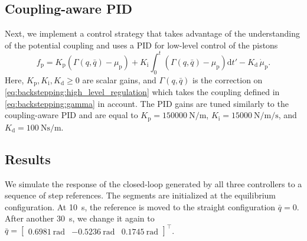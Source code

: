 %
\subsection{Coupling-aware PID}
%
Next, we implement a control strategy that takes advantage of the understanding of the potential coupling and uses a PID for low-level control of the pistons
%
\begin{equation}
    f_{\mathrm{p}} = K_\mathrm{p} \left (\Gamma(q, \bar{q})-\mu_\mathrm{p} \right ) +  K_\mathrm{i} \int_{0}^t \left ( \Gamma(q, \bar{q})-\mu_\mathrm{p} \right ) \mathrm{d}t' - K_\mathrm{d} \, \dot{\mu}_\mathrm{p}.
\end{equation}
%
Here, $K_\mathrm{p},K_\mathrm{i},K_\mathrm{d} \geq 0$ are scalar gains, and $\Gamma(q, \bar{q})$ is the correction on \eqref{eq:backstepping:high_level_regulation} which takes the coupling defined in \eqref{eq:backstepping:gamma} in account. 
%
The PID gains are tuned similarly to the coupling-aware PID
and are equal to $K_\mathrm{p} = \SI{150 000}{\newton \per \meter}$, $K_\mathrm{i} = \SI{15 000}{\newton \per \meter \per \second}$, and $K_\mathrm{d} = \SI{100}{\newton \second \per \meter}$. 

\subsection{Results}

We simulate the response of the closed-loop generated by all three controllers to a sequence of step references. The segments are initialized at the equilibrium configuration. %
At \SI{10}{s}, the reference is moved to the straight configuration $\bar{q} =  0$. After another \SI{30}{s}, we change it again to $\bar{q} = \begin{bmatrix} \SI{0.6981}{\radian} & \SI{-0.5236}{\radian} & \SI{0.1745}{\radian} \end{bmatrix}^\top$.

